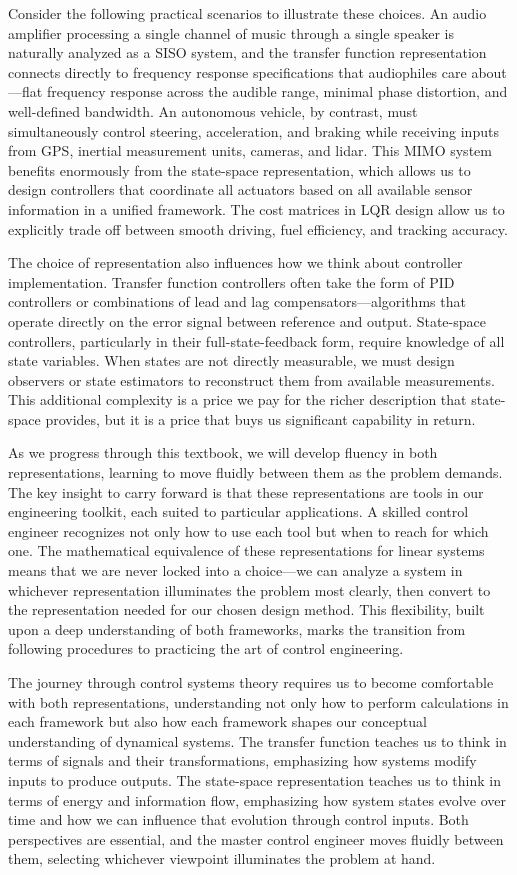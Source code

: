 Consider the following practical scenarios to illustrate these choices. An audio amplifier processing a single channel of music through a single speaker is naturally analyzed as a SISO system, and the transfer function representation connects directly to frequency response specifications that audiophiles care about—flat frequency response across the audible range, minimal phase distortion, and well-defined bandwidth. An autonomous vehicle, by contrast, must simultaneously control steering, acceleration, and braking while receiving inputs from GPS, inertial measurement units, cameras, and lidar. This MIMO system benefits enormously from the state-space representation, which allows us to design controllers that coordinate all actuators based on all available sensor information in a unified framework. The cost matrices in LQR design allow us to explicitly trade off between smooth driving, fuel efficiency, and tracking accuracy.

The choice of representation also influences how we think about controller implementation. Transfer function controllers often take the form of PID controllers or combinations of lead and lag compensators—algorithms that operate directly on the error signal between reference and output. State-space controllers, particularly in their full-state-feedback form, require knowledge of all state variables. When states are not directly measurable, we must design observers or state estimators to reconstruct them from available measurements. This additional complexity is a price we pay for the richer description that state-space provides, but it is a price that buys us significant capability in return.

As we progress through this textbook, we will develop fluency in both representations, learning to move fluidly between them as the problem demands. The key insight to carry forward is that these representations are tools in our engineering toolkit, each suited to particular applications. A skilled control engineer recognizes not only how to use each tool but when to reach for which one. The mathematical equivalence of these representations for linear systems means that we are never locked into a choice—we can analyze a system in whichever representation illuminates the problem most clearly, then convert to the representation needed for our chosen design method. This flexibility, built upon a deep understanding of both frameworks, marks the transition from following procedures to practicing the art of control engineering.

The journey through control systems theory requires us to become comfortable with both representations, understanding not only how to perform calculations in each framework but also how each framework shapes our conceptual understanding of dynamical systems. The transfer function teaches us to think in terms of signals and their transformations, emphasizing how systems modify inputs to produce outputs. The state-space representation teaches us to think in terms of energy and information flow, emphasizing how system states evolve over time and how we can influence that evolution through control inputs. Both perspectives are essential, and the master control engineer moves fluidly between them, selecting whichever viewpoint illuminates the problem at hand.